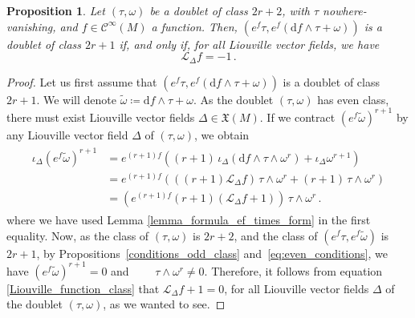 \documentclass[11pt,twoside]{article}
\theoremstyle{plain}
\newtheorem{proposition}[theorem]{Proposition}
\theoremstyle{definition}
\renewcommand{\d}{\mathrm{d}}
\newcommand{\Cinfty}{\mathscr{C}^\infty}
\newcommand*{\inn}[1]{\iota_{#1}}
\newcommand{\Lie}{\mathscr{L}}
\newcommand{\X}{\mathfrak{X}}
\def\d{\mathrm{d}}
\def\X{\mathfrak{X}}
\def\d{\mathrm{d}}
\def\Lie{\mathscr{L}}
\begin{document}
\begin{proposition}\label{change_of_class_parity}
    Let $(\tau,\omega)$ be a doublet of class $2r+2$, with $\tau$ nowhere-vanishing, and $f\in\Cinfty(M)$ a function. Then, $(e^f\tau, e^f(\d f\wedge \tau+\omega))$ is a doublet of class $2r+1$ if, and only if, for all Liouville vector fields, we have $$\Lie _{\Delta} f=-1\,.$$
\end{proposition}
\begin{proof}
   Let us first assume that 
   $(e^f\tau, e^f(\d f\wedge \tau+\omega))$ 
   is a doublet of class $2r+1$. We will denote $\widetilde \omega \coloneqq \d f \wedge \tau+\omega$. As the doublet $(\tau,\omega)$ has even class, there must exist Liouville vector fields $\Delta \in \X(M)$.
    If we contract $(e^f\widetilde \omega)^{r+1}$ by any Liouville vector field $\Delta$ of $(\tau,\omega)$, we obtain
\begin{align}\label{Liouville_function_class}
    \begin{aligned}
        \inn{\Delta}(e^f\widetilde \omega )^{r+1} &=  e^{(r+1)f}((r+1)\, \inn{\Delta}(\d f \wedge\tau\wedge\omega^{r})+\inn{\Delta}\omega^{r+1})
        \\
        &=e^{(r+1)f}(((r+1)\Lie_{\Delta}f)\,\tau\wedge\omega^{r} + (r+1) \,\tau\wedge\omega^{r})
        \\
        &=(e^{(r+1)f}(r+1)(\Lie_{\Delta} f +1 ))\,\tau\wedge\omega^{r}\,.
        \end{aligned}
    \end{align}
    where we have used Lemma \ref{lemma_formula_ef_times_form} in the first equality.
Now, as the class of $(\tau,\omega)$ is $2r+2$, and the class of $(e^f \tau, e^f \widetilde \omega )$ is $2r+1$, by Propositions~\ref{conditions_odd_class} and~\ref{eq:even_conditions}, we have
$(e^f\widetilde \omega)^{r+1}=0$ and $ \qquad\tau\wedge\omega^r\neq 0$. 
Therefore, it follows from equation \eqref{Liouville_function_class} that 
$ \Lie_{\Delta} f +1=0 $,
for all Liouville vector fields $\Delta$ of the doublet $(\tau,\omega)$, as we wanted to see.


\end{proof}
\end{document}
